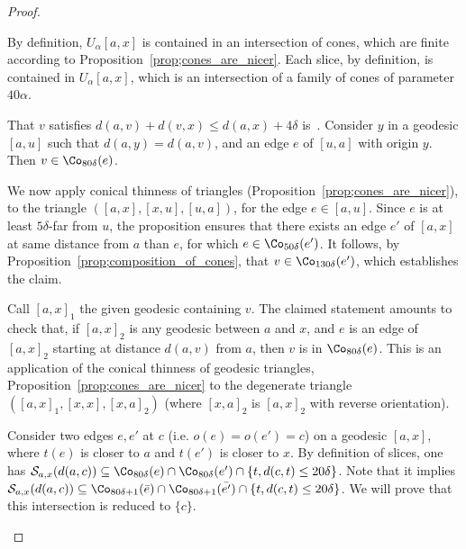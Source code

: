 \begin{proof}
\begin{step}[\eqref{lem;slices_are_finite}]
By definition, $U_{\alpha}[a,x]$ is contained in an intersection of cones, which are finite according to Proposition~\ref{prop;cones_are_nicer}. Each slice, by definition, is contained in $U_{\alpha}[a,x]$, which is an intersection of a family of cones of parameter $40\alpha$.
\end{step}

\begin{step}[\eqref{lem;stab}]
That $v$ satisfies $d(a,v) + d(v,x) \leq d(a,x)+4\delta$ is~\cite[3.4]{AL}. Consider $y$ in a geodesic $[a,u]$ such that $d(a,y) = d(a,v)$, and an edge $e$ of $[u,a]$ with origin $y$. Then $v\in \Co_{80\delta}(e)$.

We now apply conical thinness of triangles (Proposition~\ref{prop;cones_are_nicer}), to the triangle $([a,x], [x,u], [u,a])$, for the edge $e\in [a,u]$. Since $e$ is at least $5\delta$-far from $u$, the proposition ensures that there exists an edge $e'$ of $[a,x]$ at same distance from $a$ than $e$, for which $e\in \Co_{50\delta} (e')$. It follows, by Proposition~\ref{prop;composition_of_cones}, that $v\in \Co_{130\delta} (e')$, which establishes the claim.
\end{step}

\begin{step}[\eqref{lem;slices_are_nonempty}]
Call $[a,x]_1$ the given geodesic containing $v$. The claimed statement amounts to check that, if $[a,x]_2$ is any geodesic between $a$ and $x$, and $e$ is an edge of $ [a,x]_2$ starting at distance $d(a,v)$ from $a$, then $v$ is in $\Co_{80\delta}(e)$. This is an application of the conical thinness of geodesic triangles, Proposition~\ref{prop;cones_are_nicer} to the degenerate triangle $([a,x]_1, [x,x], [x,a]_2)$ (where $[x,a]_2$ is $[a,x]_2$ with reverse orientation).
\end{step}

\begin{laststep}[\eqref{lem;un_goulet_de_slice}]
Consider two edges $e,e'$ at $c$ (i.e. $o(e)=o(e')=c$) on a geodesic $[a,x]$, where $t(e) $ is closer to $a$ and $t(e')$ is closer to $x$. By definition of slices, one has $ \mathcal{S}_{a,x} (d(a,c)) \subseteq \Co_{80\delta}(e) \cap \Co_{80\delta}(e') \cap \{t, d(c,t)\leq 20\delta \}$. Note that it implies $ \mathcal{S}_{a,x} (d(a,c)) \subseteq \Co_{80\delta+1}(\bar{e}) \cap \Co_{80\delta+1}(\bar{e'}) \cap \{t, d(c,t)\leq 20\delta\}$. We will prove that this intersection is reduced to $\{c\}$.


\end{laststep}
\end{proof}
